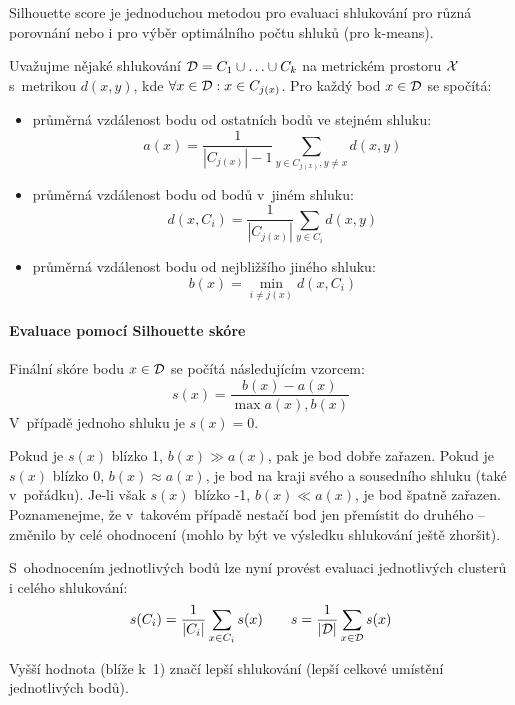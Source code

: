 Silhouette score je jednoduchou metodou pro evaluaci shlukování pro různá porovnání nebo i pro výběr optimálního počtu shluků (pro k-means).

Uvažujme nějaké shlukování $\mathcal{D} = C_1 \cup \ldots \cup C_k$ na metrickém prostoru $\mathcal{X}$ s~metrikou $d(x, y)$, kde $\forall x \in \mathcal{D}: x \in C_{j(x)}$. Pro každý bod $x \in \mathcal{D}$ se spočítá:

\begin{itemize}

    \item průměrná vzdálenost bodu od ostatních bodů ve stejném shluku:
    \[
        a(x) = \frac{1}{|C_{j(x)}| - 1} \sum_{y \in C_{j(x)}, y \neq x} d(x, y)
    \]

    \item průměrná vzdálenost bodu od bodů v~jiném shluku:
    \[
        d(x, C_i) = \frac{1}{|C_{j(x)}|} \sum_{y \in C_i} d(x, y)
    \]

    \item průměrná vzdálenost bodu od nejbližšího jiného shluku:
    \[
        b(x) = \min_{i \neq j(x)} d(x, C_i)
    \]

\end{itemize}

\paragraph{Evaluace pomocí Silhouette skóre}

Finální skóre bodu $x \in \mathcal{D}$ se počítá následujícím vzorcem:
\[
    s(x) = \frac{b(x) - a(x)}{\max {a(x), b(x)}}
\]
V~případě jednoho shluku je $s(x) = 0$.

Pokud je $s(x)$ blízko 1, $b(x) \gg a(x)$, pak je bod dobře zařazen. Pokud je $s(x)$ blízko 0, $b(x) \approx a(x)$, je bod na kraji svého a sousedního shluku (také v~pořádku). Je-li však $s(x)$ blízko -1, $b(x) \ll a(x)$, je bod špatně zařazen. Poznamenejme, že v~takovém případě nestačí bod jen přemístit do druhého -- změnilo by celé ohodnocení (mohlo by být ve výsledku shlukování ještě zhoršit).

S~ohodnocením jednotlivých bodů lze nyní provést evaluaci jednotlivých clusterů i celého shlukování:
\[
    s(C_i) = \frac{1}{|C_i|} \sum_{x \in C_i} s(x)
    \qquad
    s = \frac{1}{|\mathcal{D}|} \sum_{x \in \mathcal{D}} s(x)
\]

Vyšší hodnota (blíže k~1) značí lepší shlukování (lepší celkové umístění jednotlivých bodů).
